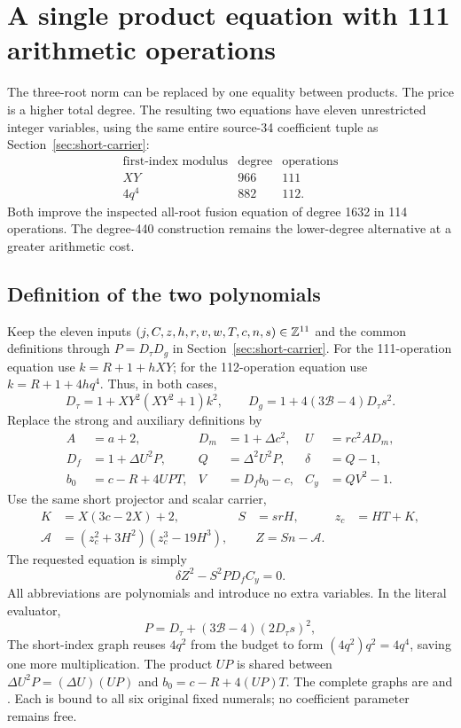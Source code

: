 \section{A single product equation with 111 arithmetic operations}
\label{sec:product-equation}
The three-root norm can be replaced by one equality between products.
The price is a higher total degree. The resulting two equations have
eleven unrestricted integer variables, using the same entire source-34
coefficient tuple as Section~\ref{sec:short-carrier}:
\[
\begin{array}{l|rr}
\text{first-index modulus}&\text{degree}&\text{operations}\\\hline
XY&966&111\\
4q^4&882&112.
\end{array}
\]
Both improve the inspected all-root fusion equation of degree 1632 in
114 operations. The degree-440 construction remains the lower-degree
alternative at a greater arithmetic cost.

\subsection{Definition of the two polynomials}
Keep the eleven inputs $(j,C,z,h,r,v,w,T,c,n,s)\in\mathbb Z^{11}$ and the
common definitions through $P=D_\tau D_g$ in
Section~\ref{sec:short-carrier}. For the 111-operation equation use
$k=R+1+hXY$; for the 112-operation equation use $k=R+1+4hq^4$.
Thus, in both cases,
\[
 D_\tau=1+XY^2(XY^2+1)k^2,
 \qquad D_g=1+4(3\mathcal B-4)D_\tau s^2.
\]
Replace the strong and auxiliary definitions by
\begin{align*}
 A&=a+2,&D_m&=1+\Delta c^2,&U&=rc^2 A D_m,\\
 D_f&=1+\Delta U^2P,&Q&=\Delta^2U^2P,&\delta&=Q-1,\\
 b_0&=c-R+4UPT,&V&=D_fb_0-c,&C_y&=QV^2-1.
\end{align*}
Use the same short projector and scalar carrier,
\begin{align*}
 K&=X(3c-2X)+2,&S&=srH,&z_c&=HT+K,\\
 \mathcal A&=(z_c^2+3H^2)(z_c^3-19H^3),&&
 Z=Sn-\mathcal A.
\end{align*}
The requested equation is simply
\begin{equation}\label{eq:single-product}
 \boxed{\delta Z^2-S^2P D_f C_y=0.}
\end{equation}
All abbreviations are polynomials and introduce no extra variables.
In the literal evaluator,
\[
 P=D_\tau+(3\mathcal B-4)(2D_\tau s)^2,
\]
The short-index graph reuses $4q^2$ from the budget to form
$(4q^2)q^2=4q^4$, saving one more multiplication. The product $UP$ is shared between
$\Delta U^2P=(\Delta U)(UP)$ and $b_0=c-R+4(UP)T$.
The complete graphs are  and
. Each is bound to all six original
fixed numerals; no coefficient parameter remains free.


